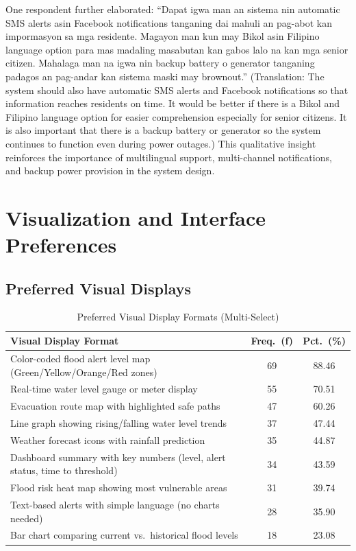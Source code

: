 \documentclass{research}
\begin{document}
One respondent further elaborated: ``Dapat igwa man an sistema nin automatic SMS
alerts asin Facebook notifications tanganing dai mahuli an pag-abot kan impormasyon
sa mga residente. Magayon man kun may Bikol asin Filipino language option para mas
madaling masabutan kan gabos lalo na kan mga senior citizen. Mahalaga man na igwa
nin backup battery o generator tanganing padagos an pag-andar kan sistema maski
may brownout.'' (Translation: The system should also have automatic SMS alerts and
Facebook notifications so that information reaches residents on time. It would be better
if there is a Bikol and Filipino language option for easier comprehension especially for
senior citizens. It is also important that there is a backup battery or generator so the
system continues to function even during power outages.) This qualitative insight
reinforces the importance of multilingual support, multi-channel notifications, and
backup power provision in the system design.
 
\section{Visualization and Interface Preferences}
 
\subsection{Preferred Visual Displays}
 
\begin{table}[htbp]
\centering
\small
\caption{Preferred Visual Display Formats (Multi-Select)}
\label{tab:visuals}
\begin{tabular}{p{9.5cm}|c|c}
\hline
\textbf{Visual Display Format} & \textbf{Freq.\ (f)} & \textbf{Pct.\ (\%)} \\
\hline
Color-coded flood alert level map (Green/Yellow/Orange/Red zones)
  & 69 & 88.46 \\[3pt]
Real-time water level gauge or meter display
  & 55 & 70.51 \\[3pt]
Evacuation route map with highlighted safe paths
  & 47 & 60.26 \\[3pt]
Line graph showing rising/falling water level trends
  & 37 & 47.44 \\[3pt]
Weather forecast icons with rainfall prediction
  & 35 & 44.87 \\[3pt]
Dashboard summary with key numbers (level, alert status, time to threshold)
  & 34 & 43.59 \\[3pt]
Flood risk heat map showing most vulnerable areas
  & 31 & 39.74 \\[3pt]
Text-based alerts with simple language (no charts needed)
  & 28 & 35.90 \\[3pt]
Bar chart comparing current vs.\ historical flood levels
  & 18 & 23.08 \\
\hline
\end{tabular}
\end{table}
 
\end{document}
